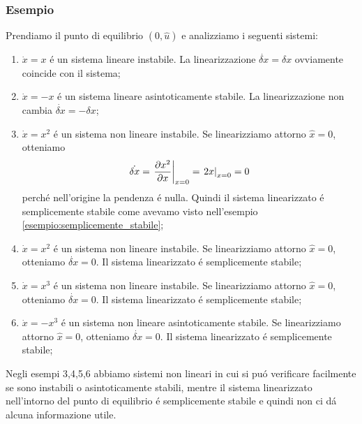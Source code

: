 \documentclass[../main.tex]{subfiles}
\begin{document}
	\subsubsection*{Esempio}
		Prendiamo il punto di equilibrio $ (0, \hat u) $ e analizziamo i seguenti sistemi:
		\begin{enumerate}
			\item
				$ \dot x = x $ \'e un sistema lineare instabile. La linearizzazione $ \dot{\delta x} = \delta x $ ovviamente coincide con il sistema;
			\item
				$ \dot x = -x $ \'e un sistema lineare asintoticamente stabile. La linearizzazione non cambia $ \dot{\delta x} = -\delta x $;
			\item
				$ \dot x = x^2 $ \'e un sistema non lineare instabile. Se linearizziamo attorno $ \hat x = 0 $, otteniamo
				\[ \dot{\delta x} = \left. \frac{\partial x^2}{\partial x} \right|_{x=0} = \left. 2x \right|_{x=0} = 0 \]
				perch\'e nell'origine la pendenza \'e nulla. Quindi il sistema linearizzato \'e semplicemente stabile come avevamo visto nell'esempio \ref{esempio:semplicemente_stabile};
			\item
				$ \dot x = x^2 $ \'e un sistema non lineare instabile. Se linearizziamo attorno $ \hat x = 0 $, otteniamo $ \dot{\delta x} = 0 $. Il sistema linearizzato \'e semplicemente stabile;
			\item
				$ \dot x = x^3 $ \'e un sistema non lineare instabile. Se linearizziamo attorno $ \hat x = 0 $, otteniamo $ \dot{\delta x} = 0 $. Il sistema linearizzato \'e semplicemente stabile;
			\item
				$ \dot x = -x^3 $ \'e un sistema non lineare asintoticamente stabile. Se linearizziamo attorno $ \hat x = 0 $, otteniamo $ \dot{\delta x} = 0 $. Il sistema linearizzato \'e semplicemente stabile;
		\end{enumerate}
		Negli esempi 3,4,5,6 abbiamo sistemi non lineari in cui si pu\'o verificare facilmente se sono instabili o asintoticamente stabili, mentre il sistema linearizzato nell'intorno del punto di equilibrio \'e semplicemente stabile e quindi non ci d\'a alcuna informazione utile.
\end{document}

